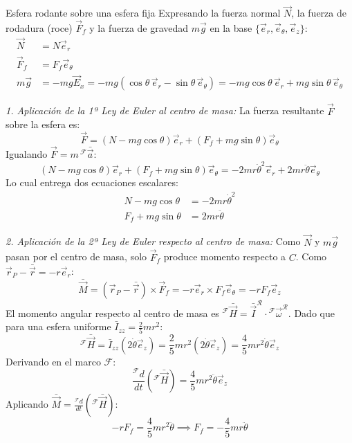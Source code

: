 \begin{solucion}{Esfera rodante sobre una esfera fija}
Expresando la fuerza normal $\vec{N}$, la fuerza de rodadura (roce) $\vec{F}_f$ y la fuerza de gravedad $m\vec{g}$ en la base $\{\vec{e}_r, \vec{e}_\theta, \vec{e}_z\}$:
\begin{align}
    \vec{N} &= N\vec{e}_r \\
    \vec{F}_f &= F_f\vec{e}_\theta \\
    m\vec{g} &= -mg\vec{E}_x = -mg(\cos\theta\,\vec{e}_r - \sin\theta\,\vec{e}_\theta) = -mg\cos\theta\,\vec{e}_r + mg\sin\theta\,\vec{e}_\theta
\end{align}

\textit{1. Aplicación de la 1ª Ley de Euler al centro de masa:}
La fuerza resultante $\vec{F}$ sobre la esfera es:
\begin{equation}
    \vec{F} = (N - mg\cos\theta)\vec{e}_r + (F_f + mg\sin\theta)\vec{e}_\theta
\end{equation}
Igualando $\vec{F} = m\,{}^{\mathcal{F}}\bar{\vec{a}}$:
\begin{equation}
    (N - mg\cos\theta)\vec{e}_r + (F_f + mg\sin\theta)\vec{e}_\theta = -2mr\dot{\theta}^2\vec{e}_r + 2mr\ddot{\theta}\vec{e}_\theta
\end{equation}
Lo cual entrega dos ecuaciones escalares:
\begin{align}
    N - mg\cos\theta &= -2mr\dot{\theta}^2 \\
    F_f + mg\sin\theta &= 2mr\ddot{\theta} \label{eq:c4_e01_p19_f}
\end{align}

\textit{2. Aplicación de la 2ª Ley de Euler respecto al centro de masa:}
Como $\vec{N}$ y $m\vec{g}$ pasan por el centro de masa, solo $\vec{F}_f$ produce momento respecto a $C$. Como $\vec{r}_P - \bar{\vec{r}} = -r\vec{e}_r$:
\begin{equation}
    \bar{\vec{M}} = (\vec{r}_P - \bar{\vec{r}}) \times \vec{F}_f = -r\vec{e}_r \times F_f\vec{e}_\theta = -rF_f\vec{e}_z
\end{equation}
El momento angular respecto al centro de masa es ${}^{\mathcal{F}}\bar{\vec{H}} = \bar{\vec{I}}^{\mathcal{R}} \cdot {}^{\mathcal{F}}\vec{\omega}^{\mathcal{R}}$. Dado que para una esfera uniforme $\bar{I}_{zz} = \frac{2}{5}mr^2$:
\begin{equation}
    {}^{\mathcal{F}}\bar{\vec{H}} = \bar{I}_{zz}(2\dot{\theta}\vec{e}_z) = \frac{2}{5}mr^2(2\dot{\theta}\vec{e}_z) = \frac{4}{5}mr^2\dot{\theta}\vec{e}_z
\end{equation}
Derivando en el marco $\mathcal{F}$:
\begin{equation}
    \frac{{}^{\mathcal{F}}d}{dt}({}^{\mathcal{F}}\bar{\vec{H}}) = \frac{4}{5}mr^2\ddot{\theta}\vec{e}_z
\end{equation}
Aplicando $\bar{\vec{M}} = \frac{{}^{\mathcal{F}}d}{dt}({}^{\mathcal{F}}\bar{\vec{H}})$:
\begin{equation}
    -rF_f = \frac{4}{5}mr^2\ddot{\theta} \implies F_f = -\frac{4}{5}mr\ddot{\theta}
\end{equation}


\end{solucion}
